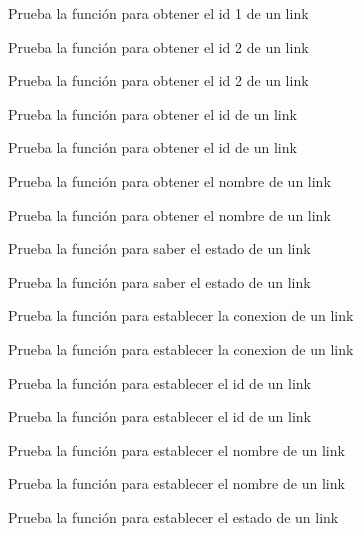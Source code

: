 \begin{DoxyRefList}
Prueba la función para obtener el id 1 de un link  
\item[\label{test__test000200}%
\Hypertarget{test__test000200}%
Member \hyperlink{link__test_8h_abe6d5eddefa0ccab66ccf641da6319b1}{test1\+\_\+link\+\_\+get\+\_\+conection\+\_\+2} ()]Prueba la función para obtener el id 2 de un link 

Prueba la función para obtener el id 2 de un link  
\item[\label{test__test000196}%
\Hypertarget{test__test000196}%
Member \hyperlink{link__test_8h_a19c70f79fd51d123173f7aaf6ae50bf8}{test1\+\_\+link\+\_\+get\+\_\+id} ()]Prueba la función para obtener el id de un link 

Prueba la función para obtener el id de un link  
\item[\label{test__test000194}%
\Hypertarget{test__test000194}%
Member \hyperlink{link__test_8h_a044128db00a5cc385d7157dea8bdf3c3}{test1\+\_\+link\+\_\+get\+\_\+name} ()]Prueba la función para obtener el nombre de un link 

Prueba la función para obtener el nombre de un link  
\item[\label{test__test000202}%
\Hypertarget{test__test000202}%
Member \hyperlink{link__test_8h_a9f7bf73b9398d551c64f6c845e9e1560}{test1\+\_\+link\+\_\+get\+\_\+status} ()]Prueba la función para saber el estado de un link 

Prueba la función para saber el estado de un link  
\item[\label{test__test000190}%
\Hypertarget{test__test000190}%
Member \hyperlink{link__test_8h_a8c70e0dc87dfcbfff2e690fbee50ebf2}{test1\+\_\+link\+\_\+set\+\_\+conection} ()]Prueba la función para establecer la conexion de un link 

Prueba la función para establecer la conexion de un link  
\item[\label{test__test000188}%
\Hypertarget{test__test000188}%
Member \hyperlink{link__test_8h_ac2b67785fdf6bb85af93e985af9ee3f2}{test1\+\_\+link\+\_\+set\+\_\+id} ()]Prueba la función para establecer el id de un link 

Prueba la función para establecer el id de un link  
\item[\label{test__test000185}%
\Hypertarget{test__test000185}%
Member \hyperlink{link__test_8h_ae0e478a0540bed26befc071591e3ff6c}{test1\+\_\+link\+\_\+set\+\_\+name} ()]Prueba la función para establecer el nombre de un link 

Prueba la función para establecer el nombre de un link  
\item[\label{test__test000192}%
\Hypertarget{test__test000192}%
Member \hyperlink{link__test_8h_a3b39fdba0c3c967716572bfb01beec27}{test1\+\_\+link\+\_\+set\+\_\+status} ()]Prueba la función para establecer el estado de un link 


\end{DoxyRefList}
